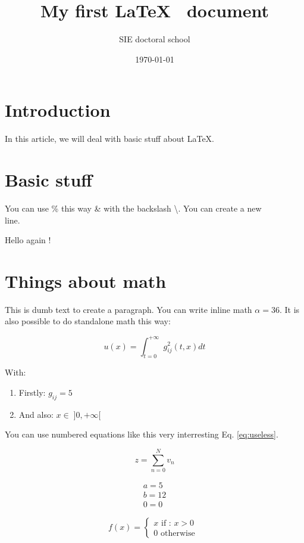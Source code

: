 \documentclass[10pt,a4paper]{article}
\title{My first \LaTeX~ document}
\author{SIE doctoral school}
\date{\today}
\begin{document}
\maketitle %

\section{Introduction}

In this article, we will  deal with basic stuff about \LaTeX.

\tableofcontents



\section{Basic stuff}

You can use \% this way \& with the backslash \textbackslash.
You can create a new \\ line.

\vspace{2cm}

Hello again !

\section{Things about math}

This is dumb text to create a paragraph.
You can write inline math $\alpha = 36$.
\blindtext[1]
It is also possible  to do standalone math this way:

$$
    u(x) = \int_{t=0}^{+\infty} g_{ij}^2(t,x) dt
$$

\noindent With: %

\begin{enumerate}
    \item Firstly: $g_{ij} = 5$
    \item And also: $x \in \; ] 0, +\infty [$ %
\end{enumerate}

\noindent You can use numbered equations like this very interresting Eq. \ref{eq:useless}.

\begin{equation}
    z = \sum_{n=0}^N v_n
    \label{eq:useless} %
\end{equation}

\begin{eqnarray}
    a =  5 \nonumber \\ %
    b = 12 \\
    0 = 0
\end{eqnarray}

\begin{equation}
    f(x) =
    \left\lbrace
    \begin{split}
        x \mbox{ if : } x > 0 \\
        0 \mbox { otherwise }
    \end{split}
    \right.
\end{equation}
\end{document}
